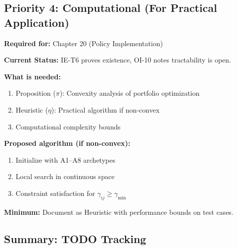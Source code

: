 \subsection{Priority 4: Computational (For Practical Application)}

\begin{tcolorbox}[colback=blue!5!white, colframe=blue!75!black,
    title=\textbf{TODO-UNMAPPED_IE-10: Portfolio Optimization Algorithm}]

\textbf{Required for:} Chapter 20 (Policy Implementation)

\textbf{Current Status:} IE-T6 proves existence, OI-10 notes tractability is open.

\textbf{What is needed:}
\begin{enumerate}[nosep]
    \item Proposition ($\pi$): Convexity analysis of portfolio optimization
    \item Heuristic ($\eta$): Practical algorithm if non-convex
    \item Computational complexity bounds
\end{enumerate}

\textbf{Proposed algorithm (if non-convex):}
\begin{enumerate}[nosep]
    \item Initialize with A1--A8 archetypes
    \item Local search in continuous space
    \item Constraint satisfaction for $\gamma_{ij} \geq \gamma_{\min}$
\end{enumerate}

\textbf{Minimum:} Document as Heuristic with performance bounds on test cases.

\end{tcolorbox}

\subsection{Summary: TODO Tracking}

